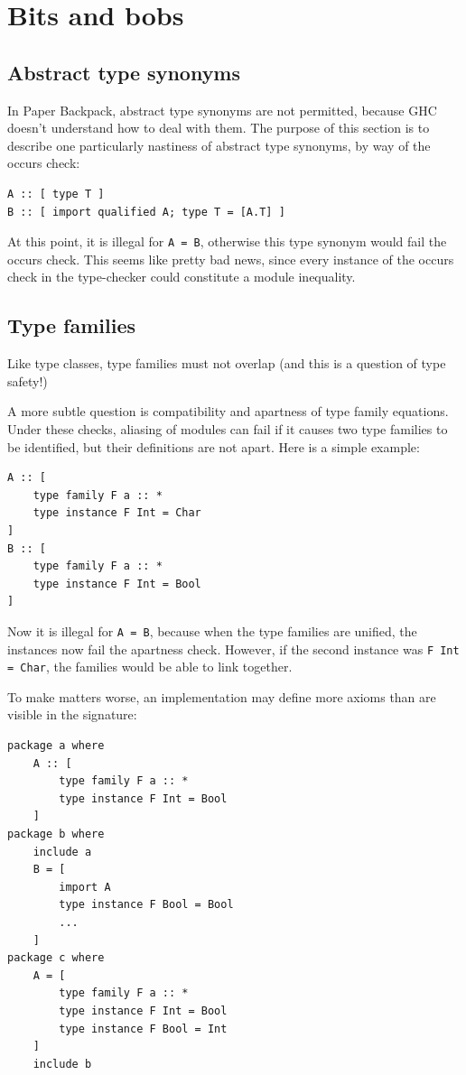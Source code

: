 \documentclass{article}
\begin{document}
\section{Bits and bobs}

\subsection{Abstract type synonyms}

In Paper Backpack, abstract type synonyms are not permitted, because GHC doesn't
understand how to deal with them.  The purpose of this section is to describe
one particularly nastiness of abstract type synonyms, by way of the occurs check:

\begin{verbatim}
A :: [ type T ]
B :: [ import qualified A; type T = [A.T] ]
\end{verbatim}

At this point, it is illegal for \verb|A = B|, otherwise this type synonym would
fail the occurs check.  This seems like pretty bad news, since every instance
of the occurs check in the type-checker could constitute a module inequality.

\subsection{Type families}

Like type classes, type families must not overlap (and this is a question of
type safety!)

A more subtle question is compatibility and apartness of type family
equations.  Under these checks, aliasing of modules can fail if it causes
two type families to be identified, but their definitions are not apart.
Here is a simple example:

\begin{verbatim}
A :: [
    type family F a :: *
    type instance F Int = Char
]
B :: [
    type family F a :: *
    type instance F Int = Bool
]
\end{verbatim}

Now it is illegal for \verb|A = B|, because when the type families are
unified, the instances now fail the apartness check.  However, if the second
instance was \verb|F Int = Char|, the families would be able to link together.

To make matters worse, an implementation may define more axioms than are
visible in the signature:

\begin{verbatim}
package a where
    A :: [
        type family F a :: *
        type instance F Int = Bool
    ]
package b where
    include a
    B = [
        import A
        type instance F Bool = Bool
        ...
    ]
package c where
    A = [
        type family F a :: *
        type instance F Int = Bool
        type instance F Bool = Int
    ]
    include b
\end{verbatim}
\end{document}
